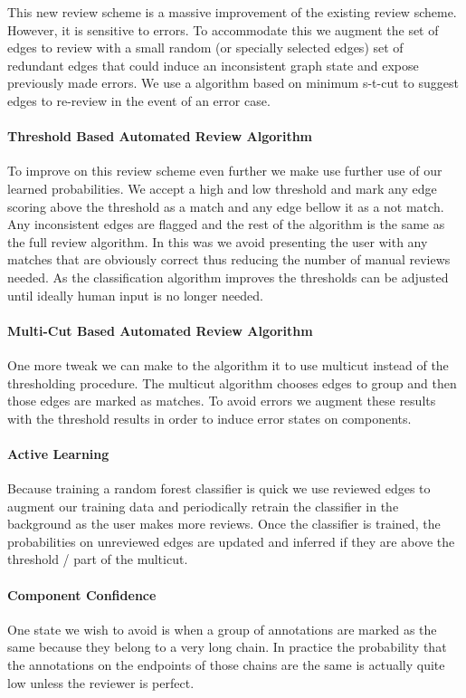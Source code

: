 This new review scheme is a massive improvement of the existing review scheme.
However, it is sensitive to errors.
To accommodate this we augment the set of edges to review with a small random
  (or specially selected edges) set of redundant edges that could induce an
  inconsistent graph state and expose previously made errors.
We use a algorithm based on minimum s-t-cut to suggest edges to re-review in
  the event of an error case.


\paragraph{Threshold Based Automated Review Algorithm}

To improve on this review scheme even further we make use further use of our
  learned probabilities.
We accept a high and low threshold and mark any edge scoring above the
  threshold as a match and any edge bellow it as a not match.
Any inconsistent edges are flagged and the rest of the algorithm is the same
  as the full review algorithm.
In this was we avoid presenting the user with any matches that are obviously
  correct thus reducing the number of manual reviews needed.
As the classification algorithm improves the thresholds can be adjusted until
  ideally human input is no longer needed.


\paragraph{Multi-Cut Based Automated Review Algorithm}

One more tweak we can make to the algorithm it to use multicut instead of the
thresholding procedure.  The multicut algorithm chooses edges to group and then
those edges are marked as matches. To avoid errors we augment these results
with the threshold results in order to induce error states on components.


\paragraph{Active Learning}
Because training a random forest classifier is quick we use reviewed edges to augment 
our training data and periodically retrain the classifier in the background as
the user makes more reviews. Once the classifier is trained, the probabilities
on unreviewed edges are updated and inferred if they are above the threshold / part of the multicut.


\paragraph{Component Confidence}
One state we wish to avoid is when a group of annotations are marked as the
same because they belong to a very long chain. In practice the probability that the annotations on the endpoints of those chains are the same is actually quite low unless the reviewer is perfect.  

